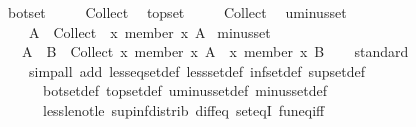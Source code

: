 \begin{isabellebody}
\isanewline
{}\isamarkupfalse%
\ bot{\isacharunderscore}{\kern0pt}set\isanewline
\ \ \ {\isachardoublequoteopen}{\isasymbottom}\ {\isacharequal}{\kern0pt}\ Collect\ {\isasymbottom}{\isachardoublequoteclose}\isanewline
\isanewline
{}\isamarkupfalse%
\ top{\isacharunderscore}{\kern0pt}set\isanewline
\ \ \ {\isachardoublequoteopen}{\isasymtop}\ {\isacharequal}{\kern0pt}\ Collect\ {\isasymtop}{\isachardoublequoteclose}\isanewline
\isanewline
{}\isamarkupfalse%
\ uminus{\isacharunderscore}{\kern0pt}set\isanewline
\ \ \ {\isachardoublequoteopen}{\isacharminus}{\kern0pt}\ A\ {\isacharequal}{\kern0pt}\ Collect\ {\isacharparenleft}{\kern0pt}{\isacharminus}{\kern0pt}\ {\isacharparenleft}{\kern0pt}{\isasymlambda}x{\isachardot}{\kern0pt}\ member\ x\ A{\isacharparenright}{\kern0pt}{\isacharparenright}{\kern0pt}{\isachardoublequoteclose}\isanewline
\isanewline
{}\isamarkupfalse%
\ minus{\isacharunderscore}{\kern0pt}set\isanewline
\ \ \ {\isachardoublequoteopen}A\ {\isacharminus}{\kern0pt}\ B\ {\isacharequal}{\kern0pt}\ Collect\ {\isacharparenleft}{\kern0pt}{\isacharparenleft}{\kern0pt}{\isasymlambda}x{\isachardot}{\kern0pt}\ member\ x\ A{\isacharparenright}{\kern0pt}\ {\isacharminus}{\kern0pt}\ {\isacharparenleft}{\kern0pt}{\isasymlambda}x{\isachardot}{\kern0pt}\ member\ x\ B{\isacharparenright}{\kern0pt}{\isacharparenright}{\kern0pt}{\isachardoublequoteclose}\isanewline
\isanewline
{}\isamarkupfalse%
\isanewline
%
\isadelimproof
\ \ %
\endisadelimproof
%
\isatagproof
{}\isamarkupfalse%
\ standard\isanewline
\ \ \ \ {\isacharparenleft}{\kern0pt}simp{\isacharunderscore}{\kern0pt}all\ add{\isacharcolon}{\kern0pt}\ less{\isacharunderscore}{\kern0pt}eq{\isacharunderscore}{\kern0pt}set{\isacharunderscore}{\kern0pt}def\ less{\isacharunderscore}{\kern0pt}set{\isacharunderscore}{\kern0pt}def\ inf{\isacharunderscore}{\kern0pt}set{\isacharunderscore}{\kern0pt}def\ sup{\isacharunderscore}{\kern0pt}set{\isacharunderscore}{\kern0pt}def\isanewline
\ \ \ \ \ \ bot{\isacharunderscore}{\kern0pt}set{\isacharunderscore}{\kern0pt}def\ top{\isacharunderscore}{\kern0pt}set{\isacharunderscore}{\kern0pt}def\ uminus{\isacharunderscore}{\kern0pt}set{\isacharunderscore}{\kern0pt}def\ minus{\isacharunderscore}{\kern0pt}set{\isacharunderscore}{\kern0pt}def\isanewline
\ \ \ \ \ \ less{\isacharunderscore}{\kern0pt}le{\isacharunderscore}{\kern0pt}not{\isacharunderscore}{\kern0pt}le\ sup{\isacharunderscore}{\kern0pt}inf{\isacharunderscore}{\kern0pt}distrib{}\ diff{\isacharunderscore}{\kern0pt}eq\ set{\isacharunderscore}{\kern0pt}eqI\ fun{\isacharunderscore}{\kern0pt}eq{\isacharunderscore}{\kern0pt}iff\isanewline

\end{isabellebody}
